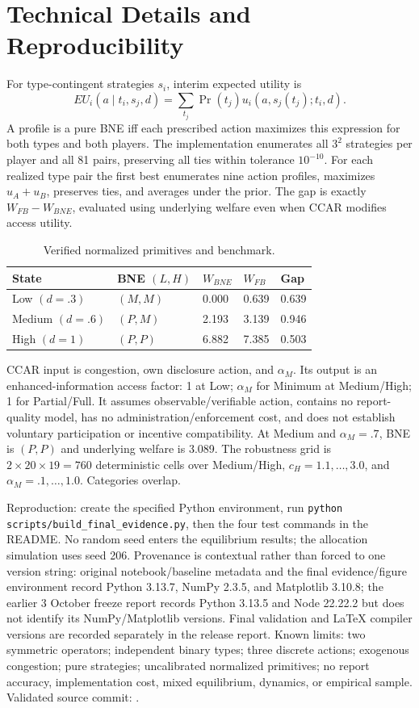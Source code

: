 

\appendix
\section{Technical Details and Reproducibility}
\label{app:technical}
For type-contingent strategies $s_i$, interim expected utility is
\[EU_i(a\mid t_i,s_j,d)=\sum_{t_j}\Pr(t_j)u_i(a,s_j(t_j);t_i,d).\]
A profile is a pure BNE iff each prescribed action maximizes this expression for both types and both players. The implementation enumerates all $3^2$ strategies per player and all 81 pairs, preserving all ties within tolerance $10^{-10}$. For each realized type pair the first best enumerates nine action profiles, maximizes $u_A+u_B$, preserves ties, and averages under the prior. The gap is exactly $W_{FB}-W_{BNE}$, evaluated using underlying welfare even when CCAR modifies access utility.

\begin{table}[H]\centering\small\caption{Verified normalized primitives and benchmark.}
\begin{tabular}{@{}lllll@{}}\toprule
State & BNE $(L,H)$ & $W_{BNE}$ & $W_{FB}$ & Gap\\\midrule
Low $(d=.3)$ & $(M,M)$ & 0.000 & 0.639 & 0.639\\
Medium $(d=.6)$ & $(P,M)$ & 2.193 & 3.139 & 0.946\\
High $(d=1)$ & $(P,P)$ & 6.882 & 7.385 & 0.503\\\bottomrule
\end{tabular}\end{table}

CCAR input is congestion, own disclosure action, and $\alpha_M$. Its output is an enhanced-information access factor: 1 at Low; $\alpha_M$ for Minimum at Medium/High; 1 for Partial/Full. It assumes observable/verifiable action, contains no report-quality model, has no administration/enforcement cost, and does not establish voluntary participation or incentive compatibility. At Medium and $\alpha_M=.7$, BNE is $(P,P)$ and underlying welfare is 3.089. The robustness grid is $2\times20\times19=760$ deterministic cells over Medium/High, $c_H=1.1,\ldots,3.0$, and $\alpha_M=.1,\ldots,1.0$. Categories overlap.

Reproduction: create the specified Python environment, run \texttt{python scripts/build\_final\_evidence.py}, then the four test commands in the README. No random seed enters the equilibrium results; the allocation simulation uses seed 206. Provenance is contextual rather than forced to one version string: original notebook/baseline metadata and the final evidence/figure environment record Python 3.13.7, NumPy 2.3.5, and Matplotlib 3.10.8; the earlier 3 October freeze report records Python 3.13.5 and Node 22.22.2 but does not identify its NumPy/Matplotlib versions. Final validation and LaTeX compiler versions are recorded separately in the release report. Known limits: two symmetric operators; independent binary types; three discrete actions; exogenous congestion; pure strategies; uncalibrated normalized primitives; no report accuracy, implementation cost, mixed equilibrium, dynamics, or empirical sample. Validated source commit: \TestedCommit.

